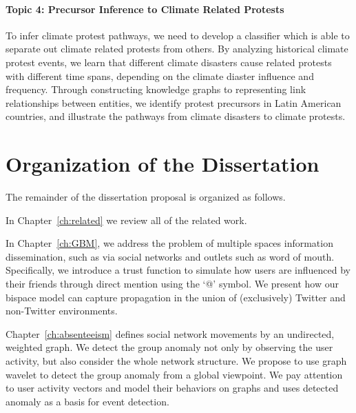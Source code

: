 \paragraph{Topic 4: Precursor Inference to Climate Related Protests}
To infer climate protest pathways, we need to develop a classifier which is able to separate out climate related protests from others. By analyzing historical climate protest events, we learn that different climate disasters cause related protests with different time spans, depending on the climate diaster influence and frequency. Through constructing knowledge graphs to representing link relationships between entities, we identify protest
precursors in Latin American countries, and 
illustrate the pathways from climate disasters to climate protests. 


\section{Organization of the Dissertation}
The remainder of the dissertation proposal is organized as follows.

In Chapter~\ref{ch:related} we review all of the related work.

In Chapter~\ref{ch:GBM}, we address the problem of multiple spaces information dissemination, such as via social networks and outlets such as word of mouth. Specifically, we introduce a trust function to simulate how users are influenced by their friends through direct mention using the `@' symbol. We present how our bispace model can capture propagation in the union of (exclusively) Twitter and non-Twitter environments.

Chapter~\ref{ch:absenteeism} defines social network movements by an undirected, weighted graph. We detect the group anomaly not only by observing the user activity, but also consider the whole network structure. We propose to use graph wavelet to detect the group anomaly from a global viewpoint. We pay attention to user activity vectors and model their behaviors on graphs and uses detected anomaly as a basis for event detection.


